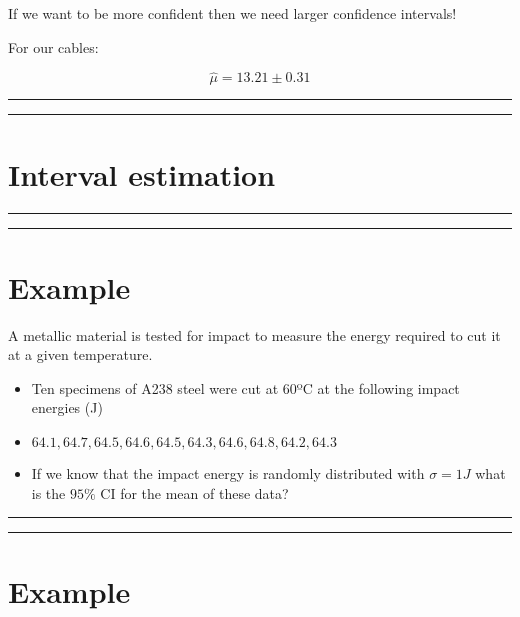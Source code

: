 \documentclass[
]{book}
\begin{document}
If we want to be more confident then we need larger confidence intervals!

For our cables:

\[\hat{\mu}= 13.21 \pm 0.31\]

\begin{center}\rule{0.5\linewidth}{0.5pt}\end{center}

\begin{center}\rule{0.5\linewidth}{0.5pt}\end{center}

\hypertarget{interval-estimation-8}{%
\section{Interval estimation}\label{interval-estimation-8}}

\begin{center}\rule{0.5\linewidth}{0.5pt}\end{center}

\begin{center}\rule{0.5\linewidth}{0.5pt}\end{center}

\hypertarget{example-17}{%
\section{Example}\label{example-17}}

A metallic material is tested for impact to measure the energy required to cut it at a given temperature.

\begin{itemize}
\item
  Ten specimens of A238 steel were cut at 60ºC at the following impact energies (J)
\item
  \(64.1, 64.7, 64.5, 64.6, 64.5, 64.3, 64.6, 64.8, 64.2, 64.3\)
\item
  If we know that the impact energy is randomly distributed with \(\sigma=1J\) what is the \(95\%\) CI for the mean of these data?
\end{itemize}

\begin{center}\rule{0.5\linewidth}{0.5pt}\end{center}

\begin{center}\rule{0.5\linewidth}{0.5pt}\end{center}

\hypertarget{example-18}{%
\section{Example}\label{example-18}}
\end{document}
